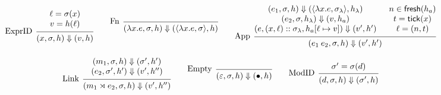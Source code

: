 \documentclass{article}
\theoremstyle{definition}
\newcommand*{\cons}{::}
\newcommand*{\modid}{d}
\newcommand*{\ctx}{\sigma}
\newcommand*{\mem}{h}
\newcommand*{\link}[2]{{#1}\rtimes{#2}}
\newcommand*{\tick}{\mathsf{tick}}
\newcommand*{\fresh}{\mathsf{fresh}}
\begin{document}
\begin{figure}[h!]
  \footnotesize
  \begin{flushright}
    \fbox{$(e,s)\Downarrow (v,\mem)$ and $(m,s)\Downarrow (\ctx,\mem)$}
  \end{flushright}
  \centering
  \vspace{0pt} %
  \[
    \begin{prooftree}
      \hypo{
        \begin{matrix}
          \ell=\ctx(x) \\
          v=\mem(\ell)
        \end{matrix}}
      \infer[left label=ExprID]1{
      (x, \ctx,\mem)
      \Downarrow
      (v,\mem)
      }
    \end{prooftree}\qquad
    \begin{prooftree}
      \infer[left label=Fn]0{
      (\lambda x.e, \ctx,\mem)
      \Downarrow
      (\langle\lambda x.e, \ctx\rangle,\mem)
      }
    \end{prooftree}\qquad
    \begin{prooftree}
      \hypo{
        \begin{matrix}
          (e_{1}, \ctx, \mem)
          \Downarrow
          (\langle\lambda x.e, \ctx_{\lambda}\rangle,\mem_\lambda) \\
          (e_{2}, \ctx, \mem_\lambda)
          \Downarrow
          (v, \mem_a)                                              \\
          (e, (x, \ell)\cons \ctx_{\lambda}, \mem_a[\ell\mapsto v])
          \Downarrow
          (v', \mem')
        \end{matrix}
      }
      \hypo{
        \begin{matrix}
          n\in\fresh(\mem_a) \\
          t=\tick(x)         \\
          \ell=(n,t)
        \end{matrix}
      }
      \infer[left label={App}]2{
      (e_{1}\:e_{2}, \ctx, \mem)
      \Downarrow
      (v', \mem')
      }
    \end{prooftree}
  \]

  \[
    \begin{prooftree}
      \hypo{
        \begin{matrix}
          (m_{1}, \ctx, \mem)
          \Downarrow
          (\ctx', \mem') \\
          (e_{2}, \ctx', \mem')
          \Downarrow
          (v',\mem'')
        \end{matrix}
      }
      \infer[left label=Link]1{
      (\link{m_{1}}{e_{2}}, \ctx, \mem)
      \Downarrow
      (v',\mem'')
      }
    \end{prooftree}\qquad
    \begin{prooftree}
      \infer[left label=Empty]0{
      (\varepsilon, \ctx, \mem)
      \Downarrow
      (\bullet, \mem)
      }
    \end{prooftree}\qquad
    \begin{prooftree}
      \hypo{\ctx'=\ctx(\modid)}
      \infer[left label=ModID]1{
      (\modid, \ctx, \mem)
      \Downarrow
      (\ctx', \mem)
      }
    \end{prooftree}
  \]


\end{figure}
\end{document}
